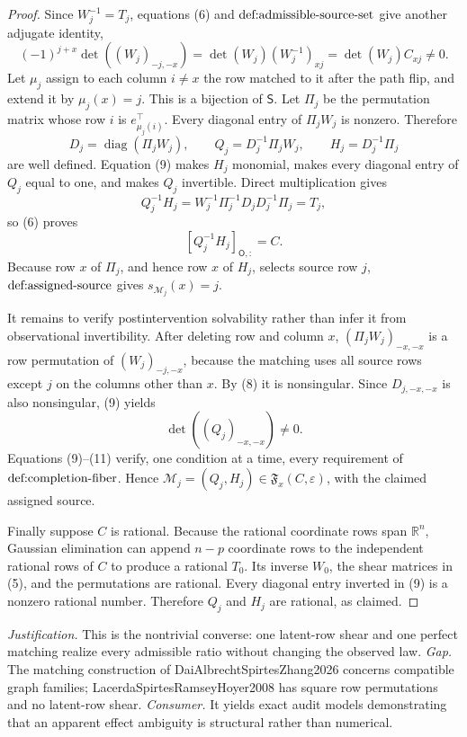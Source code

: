 \documentclass{article}
\begin{document}
\begin{proof}
Since \(W_j^{-1}=T_j\), equations (6) and \(\textnormal{def:admissible-source-set}\) give another adjugate identity,
\[
 (-1)^{j+x}\det((W_j)_{-j,-x})
 =\det(W_j)(W_j^{-1})_{xj}
 =\det(W_j)C_{xj}\ne0.                                                      \tag{8}
\]
Let \(\mu_j\) assign to each column \(i\ne x\) the row matched to it after the path flip, and extend it by \(\mu_j(x)=j\).  This is a bijection of \(\mathsf S\).  Let \(\Pi_j\) be the permutation matrix whose row \(i\) is \(e_{\mu_j(i)}^\top\).  Every diagonal entry of \(\Pi_jW_j\) is nonzero.  Therefore
\[
 D_j=\operatorname{diag}(\Pi_jW_j),\qquad
 Q_j=D_j^{-1}\Pi_jW_j,\qquad
 H_j=D_j^{-1}\Pi_j                                                       \tag{9}
\]
are well defined.  Equation (9) makes \(H_j\) monomial, makes every diagonal entry of \(Q_j\) equal to one, and makes \(Q_j\) invertible.  Direct multiplication gives
\[
 Q_j^{-1}H_j
 =W_j^{-1}\Pi_j^{-1}D_jD_j^{-1}\Pi_j
 =T_j,
\]
so (6) proves
\[
 [Q_j^{-1}H_j]_{\mathsf O,:}=C.                                            \tag{10}
\]
Because row \(x\) of \(\Pi_j\), and hence row \(x\) of \(H_j\), selects source row \(j\), \(\textnormal{def:assigned-source}\) gives \(s_{\mathcal M_j}(x)=j\).

It remains to verify postintervention solvability rather than infer it from observational invertibility.  After deleting row and column \(x\), \((\Pi_jW_j)_{-x,-x}\) is a row permutation of \((W_j)_{-j,-x}\), because the matching uses all source rows except \(j\) on the columns other than \(x\).  By (8) it is nonsingular.  Since \(D_{j,-x,-x}\) is also nonsingular, (9) yields
\[
 \det((Q_j)_{-x,-x})\ne0.                                                   \tag{11}
\]
Equations (9)--(11) verify, one condition at a time, every requirement of \(\textnormal{def:completion-fiber}\).  Hence \(\mathcal M_j=(Q_j,H_j)\in\mathfrak F_x(C,\varepsilon)\), with the claimed assigned source.

Finally suppose \(C\) is rational.  Because the rational coordinate rows span \(\mathbb R^n\), Gaussian elimination can append \(n-p\) coordinate rows to the independent rational rows of \(C\) to produce a rational \(T_0\).  Its inverse \(W_0\), the shear matrices in (5), and the permutations are rational.  Every diagonal entry inverted in (9) is a nonzero rational number.  Therefore \(Q_j\) and \(H_j\) are rational, as claimed.
\end{proof}
\par\smallskip\noindent \textit{Justification.} This is the nontrivial converse: one latent-row shear and one perfect matching realize every admissible ratio without changing the observed law. \textit{Gap.} The matching construction of DaiAlbrechtSpirtesZhang2026 concerns compatible graph families; LacerdaSpirtesRamseyHoyer2008 has square row permutations and no latent-row shear. \textit{Consumer.} It yields exact audit models demonstrating that an apparent effect ambiguity is structural rather than numerical.
\end{document}
